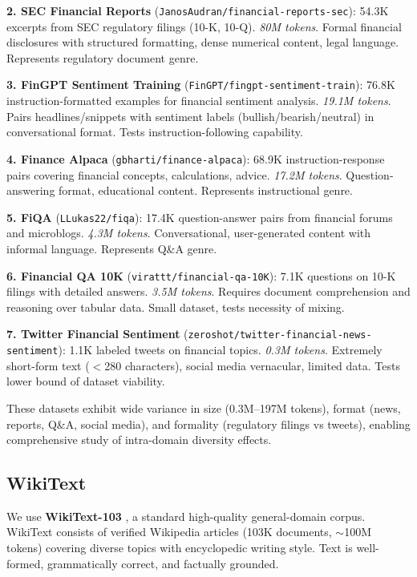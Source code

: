 \textbf{2. SEC Financial Reports} (\texttt{JanosAudran/financial-reports-sec}): 54.3K excerpts from SEC regulatory filings (10-K, 10-Q). \textit{80M tokens}. Formal financial disclosures with structured formatting, dense numerical content, legal language. Represents regulatory document genre.

\textbf{3. FinGPT Sentiment Training} (\texttt{FinGPT/fingpt-sentiment-train}): 76.8K instruction-formatted examples for financial sentiment analysis. \textit{19.1M tokens}. Pairs headlines/snippets with sentiment labels (bullish/bearish/neutral) in conversational format. Tests instruction-following capability.

\textbf{4. Finance Alpaca} (\texttt{gbharti/finance-alpaca}): 68.9K instruction-response pairs covering financial concepts, calculations, advice. \textit{17.2M tokens}. Question-answering format, educational content. Represents instructional genre.

\textbf{5. FiQA} (\texttt{LLukas22/fiqa}): 17.4K question-answer pairs from financial forums and microblogs. \textit{4.3M tokens}. Conversational, user-generated content with informal language. Represents Q\&A genre.

\textbf{6. Financial QA 10K} (\texttt{virattt/financial-qa-10K}): 7.1K questions on 10-K filings with detailed answers. \textit{3.5M tokens}. Requires document comprehension and reasoning over tabular data. Small dataset, tests necessity of mixing.

\textbf{7. Twitter Financial Sentiment} (\texttt{zeroshot/twitter-financial-news-sentiment}): 1.1K labeled tweets on financial topics. \textit{0.3M tokens}. Extremely short-form text ($<$280 characters), social media vernacular, limited data. Tests lower bound of dataset viability.

These datasets exhibit wide variance in size (0.3M--197M tokens), format (news, reports, Q\&A, social media), and formality (regulatory filings vs tweets), enabling comprehensive study of intra-domain diversity effects.

\subsection{WikiText}

We use \textbf{WikiText-103} \parencite{merity2017pointer}, a standard high-quality general-domain corpus. WikiText consists of verified Wikipedia articles (103K documents, $\sim$100M tokens) covering diverse topics with encyclopedic writing style. Text is well-formed, grammatically correct, and factually grounded.

